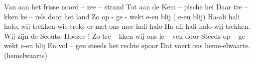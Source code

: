 \beginverse
Van  aan  het  frisse  noord – zee – strand
Tot  aan de  Kem – pische  hei
Daar  tre – kken  ke – rels  door  het  land
Zo  op - ge - wekt  e-en  blij  ( e-en blij)
\endverse
\beginchorus
Ha-ali hali halo, wij trekken 
wie trekt er met ons mee hali halo
Ha-ali hali halo wij trekken.
Wij zijn de Scouts, Hoezee !
\endchorus
\beginverse
Zo  tre – kken  wij  ons  le – ven  door
Steeds  op – ge – wekt  e-en  blij
En  vol – gen steeds  het  rechte  spoor
Dat  voert  ons  heme-elwaarts. (hemelwaarts)
\endverse
\endsong